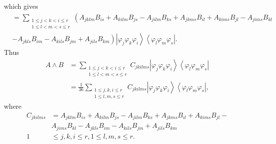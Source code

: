 \documentclass[aps,preprint]{revtex4}%
\begin{document}
which gives%
\begin{align}
&  =\sum_{\substack{1\leq j<k<i\leq r\\1\leq l<m<s\leq r}}\left(
A_{jklm}B_{is}+A_{kilm}B_{js}-A_{jilm}B_{ks}\right.  +A_{jkms}B_{il}%
+A_{kims}B_{jl}-A_{jims}B_{kl}\\
&  -\left.  A_{jkls}B_{im}-A_{kils}B_{jm}+A_{jils}B_{km}\right)  \left\vert
\varphi_{j}\varphi_{k}\varphi_{i}\right\rangle \left\langle \varphi_{l}%
\varphi_{m}\varphi_{s}\right\vert .
\end{align}
Thus
\begin{align}
A\wedge B  &  =\sum_{\substack{1\leq j<k<i\leq r\\1\leq l<m<s\leq
r}}C_{jkilms}\left\vert \varphi_{j}\varphi_{k}\varphi_{i}\right\rangle
\left\langle \varphi_{l}\varphi_{m}\varphi_{s}\right\vert \\
&  =\frac{1}{36}\sum_{\substack{1\leq j,k,i\leq r\\1\leq l,m,s\leq
r}}C_{jkilms}\left\vert \varphi_{j}\varphi_{k}\varphi_{i}\right\rangle
\left\langle \varphi_{l}\varphi_{m}\varphi_{s}\right\vert ,
\end{align}
where
\begin{align}
C_{jkilms}  &  =A_{jklm}B_{is}+A_{kilm}B_{js}-A_{jilm}B_{ks}+A_{jkms}%
B_{il}+A_{kims}B_{jl}-\nonumber\\
&  A_{jims}B_{kl}-A_{jkls}B_{im}-A_{kils}B_{jm}+A_{jils}B_{km}\nonumber\\
1  &  \leq j,k,i\leq r,1\leq l,m,s\leq r.
\end{align}
\end{document}

